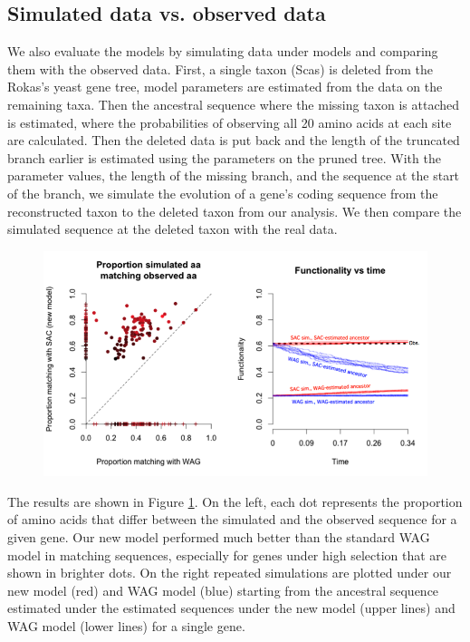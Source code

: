 \documentclass[13pt]{article}
\begin{document}
\subsection{Simulated data vs. observed data}
We also evaluate the models by simulating data under models and comparing them with the observed data. 
First, a single taxon (Scas) is deleted from the Rokas's yeast gene tree, model parameters are estimated from the data on the remaining taxa. 
Then the ancestral sequence where the missing taxon is attached is estimated, where the probabilities of observing all 20 amino acids at each site are calculated. 
Then the deleted data is put back and the length of the truncated branch earlier is estimated using the parameters on the pruned tree. 
With the parameter values, the length of the missing branch, and the sequence at the start of the branch, we simulate the evolution of a gene's coding sequence from the reconstructed taxon to the deleted taxon from our analysis.
We then compare the simulated sequence at the deleted taxon with the real data. 
\begin{figure}[h]
\centering
\includegraphics[width=\textwidth]{simulation.png}
\label{fig:simulation}
\end{figure}
The results are shown in Figure \ref{fig:simulation}. 
On the left, each dot represents the proportion of amino acids that differ between the simulated and the observed sequence for a given gene. 
Our new model performed much better than the standard WAG model in matching sequences, especially for genes under high selection that are shown in brighter dots. 
On the right repeated simulations are plotted under our new model (red) and WAG model (blue) starting from the ancestral sequence estimated under the estimated sequences under the new model (upper lines) and WAG model (lower lines) for a single gene. 
\end{document}

